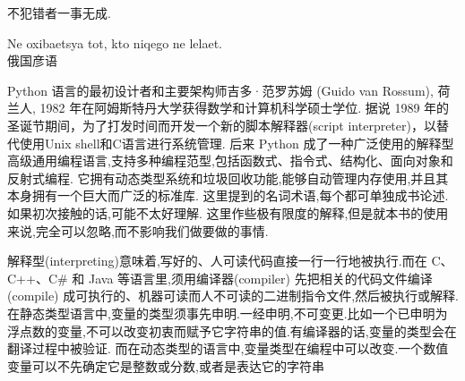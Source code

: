 \documentclass[main.tex]{subfiles}
\begin{document}
\begin{flushright}
	\begin{kaishu}
		不犯错者一事无成.\\
	\end{kaishu}
{\selectfont Ne oxibaet{}s{ya} tot, kto niqego ne lelaet.}\\
俄国彦语
\end{flushright}

Python 语言的最初设计者和主要架构师吉多·范罗苏姆 (Guido van Rossum), 荷兰人, 1982 年在阿姆斯特丹大学获得数学和计算机科学硕士学位.
据说 1989 年的圣诞节期间，为了打发时间而开发一个新的脚本解释器(script interpreter)，以替代使用Unix shell和C语言进行系统管理.
后来 Python 成了一种广泛使用的解释型高级通用编程语言,支持多种编程范型,包括函数式、指令式、结构化、面向对象和反射式编程.
它拥有动态类型系统和垃圾回收功能,能够自动管理内存使用,并且其本身拥有一个巨大而广泛的标准库.
这里提到的名词术语,每个都可单独成书论述.如果初次接触的话,可能不太好理解.
这里作些极有限度的解释,但是就本书的使用来说,完全可以忽略,而不影响我们做要做的事情.

解释型(interpreting)意味着,写好的、人可读代码直接一行一行地被执行.而在 C、C++、C\# 和 Java 等语言里,须用编译器(compiler) 先把相关的代码文件编译(compile)
成可执行的、机器可读而人不可读的二进制指令文件,然后被执行或解释.在静态类型语言中,变量的类型须事先申明.一经申明,不可变更.比如一个已申明为浮点数的变量,不可以改变初衷而赋予它字符串的值.有编译器的话,变量的类型会在翻译过程中被验证.
而在动态类型的语言中,变量类型在编程中可以改变.一个数值变量可以不先确定它是整数或分数,或者是表达它的字符串
\end{document}
